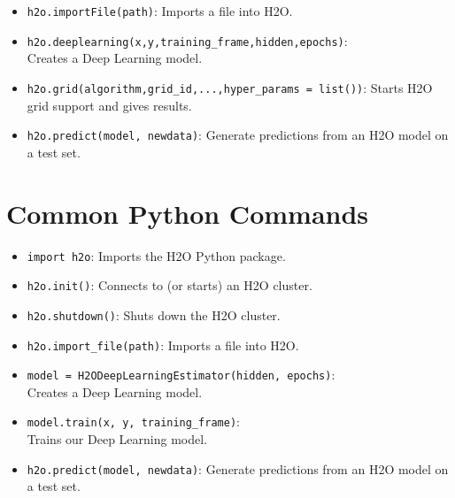 {{\begin{itemize}
\item \texttt{h2o.importFile(path)}: Imports a file into H2O.

\item \texttt{h2o.deeplearning(x,y,training\_frame,hidden,epochs)}:\\ Creates a Deep Learning model.

\item \texttt{h2o.grid(algorithm,grid\_id,...,hyper\_params = list())}: Starts H2O grid support and gives results.

\item \texttt{h2o.predict(model, newdata)}: Generate predictions from an H2O model on a test set.

\end{itemize}

\section{Common Python Commands}
\begin{itemize}
\item \texttt{import h2o}:  Imports the H2O Python package.

\item \texttt{h2o.init()}:  Connects to (or starts) an H2O cluster.

\item \texttt{h2o.shutdown()}: Shuts down the H2O cluster.

\item \texttt{h2o.import\_file(path)}: Imports a file into H2O.

\item \texttt{model = H2ODeepLearningEstimator(hidden, epochs)}: \\ Creates a Deep Learning model.

\item \texttt{model.train(x, y, training\_frame)}: \\ Trains our Deep Learning model.


\item \texttt{h2o.predict(model, newdata)}: Generate predictions from an H2O model on a test set.

\end{itemize}

}}
